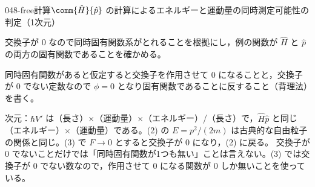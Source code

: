 \documentclass[uplatex,dvipdfmx,a4paper,11pt]{jsarticle}
\begin{document}
\begin{mondai}{048-free}{計算}{$\comm{\hat{H}}{\hat{p}}$ の計算によるエネルギーと運動量の同時測定可能性の判定（1次元）}
\begin{tadashii}
\begin{ronten}
  \item {} 交換子が $0$ なので同時固有関数系がとれることを根拠にし，例の関数が $\hat{H}$ と $\hat{p}$ の両方の固有関数であることを確かめる。
  \item {} 同時固有関数があると仮定すると交換子を作用させて $0$ になることと，交換子が $0$ でない定数なので $\phi=0$ となり固有関数であることに反すること（背理法）を書く。
\end{ronten}
\kenzan 次元：$\hbar V'$ は（長さ）×（運動量）×（エネルギー）/（長さ）で，$\hat{H}\hat{p}$ と同じ（エネルギー）×（運動量）である。(2) の $E=p^{2}/(2m)$ は古典的な自由粒子の関係と同じ。(3) で $F\to 0$ とすると交換子が $0$ になり，(2) に戻る。
\tsumazuki 交換子が $0$ でないことだけでは「同時固有関数が1つも無い」ことは言えない。(3) では交換子が $0$ でない数なので，作用させて $0$ になる関数が $0$ しか無いことを使っている。
\end{tadashii}
\end{mondai}
\end{document}
